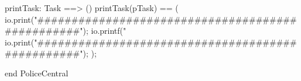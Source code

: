 \documentclass[a4paper]{article}
\begin{document}
\begin{vdm_al}
    printTask: Task ==> ()
    printTask(pTask) ==
        ( 
            io.print("#################################################\n");
            io.printf("%
            io.print("#################################################\n\n");
        );

end PoliceCentral
\end{vdm_al}
\end{document}
